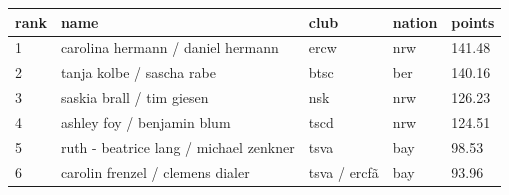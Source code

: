 \documentclass{article}
\begin{document}
\begin{tabular}{lllll}
\toprule
rank & name & club & nation & points \\
\midrule
1 & carolina hermann / daniel hermann & ercw & nrw & 141.48 \\
2 & tanja kolbe / sascha rabe & btsc & ber & 140.16 \\
3 & saskia brall / tim giesen & nsk & nrw & 126.23 \\
4 & ashley foy / benjamin blum & tscd & nrw & 124.51 \\
5 & ruth - beatrice lang / michael zenkner & tsva & bay & 98.53 \\
6 & carolin frenzel / clemens dialer & tsva / ercfã & bay & 93.96 \\
\bottomrule
\end{tabular}
\end{document}
